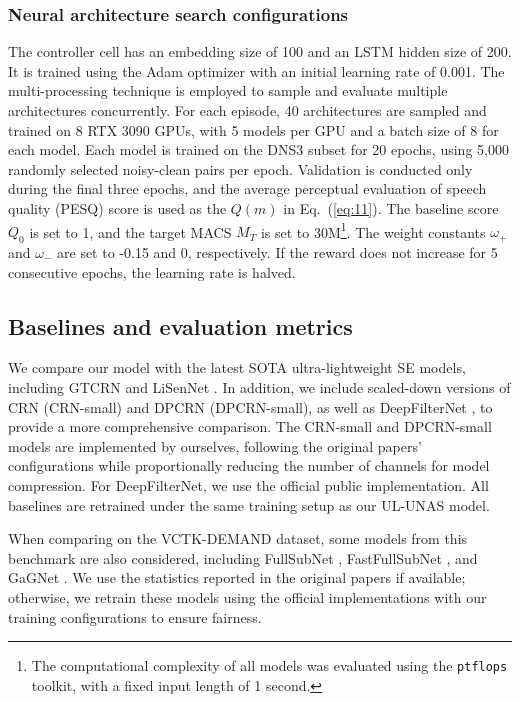 \documentclass[journal]{IEEEtran}
\newcommand{\rev}[1]{#1}
\begin{document}
\subsubsection{Neural architecture search configurations}
The controller cell has an embedding size of 100 and an LSTM hidden size of 200. It is trained using the Adam optimizer with an initial learning rate of 0.001. The multi-processing technique is employed to sample and evaluate multiple architectures concurrently. For each episode, 40 architectures are sampled and trained on 8 RTX 3090 GPUs, with 5 models per GPU and a batch size of 8 for each model. Each model is trained on the DNS3 subset for 20 epochs, using 5,000 randomly selected noisy-clean pairs per epoch. Validation is conducted only during the final three epochs, and the average perceptual evaluation of speech quality (PESQ) \cite{PESQ} score is used as the $Q(m)$ in Eq.~(\ref{eq:11}). The baseline score $Q_0$ is set to 1, and the target MACS $M_T$ is set to \rev{30M}\footnote{\rev{The computational complexity of all models was evaluated using the \texttt{ptflops} toolkit, with a fixed input length of 1 second.}}. The weight constants $\omega_{+}$ and $\omega_{-}$ are set to -0.15 and 0, respectively. If the reward does not increase for 5 consecutive epochs, the learning rate is halved. 

\subsection{\rev{Baselines} and evaluation metrics}
We compare our model with the latest SOTA ultra-lightweight SE models, including GTCRN \cite{GTCRN} and LiSenNet \cite{LiSenNet}. \rev{In addition, we include scaled-down versions of CRN \cite{CRN} (CRN-small) and DPCRN \cite{DPCRN} (DPCRN-small), as well as DeepFilterNet \cite{DeepFilterNet}, to provide a more comprehensive comparison. The CRN-small and DPCRN-small models are implemented by ourselves, following the original papers’ configurations while proportionally reducing the number of channels for model compression. For DeepFilterNet, we use the official public implementation. All baselines are retrained under the same training setup as our UL-UNAS model}.

When comparing on the VCTK-DEMAND dataset, some models from this benchmark are also considered, including FullSubNet \cite{FullSubNet}, FastFullSubNet \cite{FastFullSubNet}, and GaGNet \cite{GaGNet}. We use the statistics reported in the original papers if available; otherwise, we retrain these models using the official implementations with our training configurations to ensure fairness.
\end{document}
